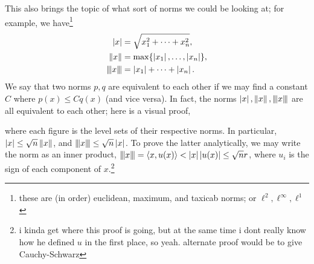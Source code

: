 \newpage
\noindent This also brings the topic of what sort of norms we could be looking at; for example, we have\footnote{these are (in order) euclidean, maximum, and taxicab norms; or $\ell^2, \ell^\infty, \ell^1$}
\begin{align*}
    \abs{x} &= \sqrt{x_1^2 + \dots + x_n^2}, \\
    \norm{x} &= \max \{\abs{x_1}, \dots, \abs{x_n}\}, \\
    \triplenorm{x} &= \abs{x_1} + \dots + \abs{x_n}.
\end{align*}
We say that two norms $p, q$ are equivalent to each other if we may find a constant $C$ where $p(x) \leq Cq(x)$ (and vice versa). In fact, the norms $\abs{x}, \norm{x}, \triplenorm{x}$ are all equivalent to each other; here is a visual proof,
\begin{center}  \end{center}
where each figure is the level sets of their respective norms. In particular, $\abs{x} \leq \sqrt{n} \norm{x}$, and $\triplenorm{x} \leq \sqrt{n} \abs{x}$. To prove the latter analytically, we may write the norm as an inner product, $\triplenorm{x} = \left< x, u(x) \right> < \abs{x} \abs{u(x)} \leq \sqrt{n}r$, where $u_i$ is the sign of each component of $x$.\footnote{i kinda get where this proof is going, but at the same time i dont really know how he defined $u$ in the first place, so yeah. alternate proof would be to give Cauchy-Schwarz}